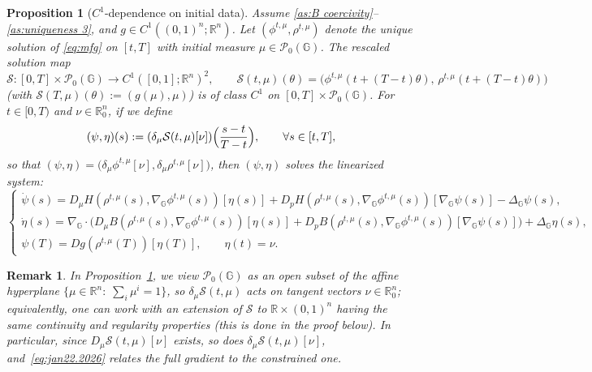 \documentclass[10pt]{article}
\newtheorem{proposition}[theorem]{Proposition}
\newtheorem{remark}[theorem]{Remark}
\numberwithin{equation}{section}
\newcommand{\cP}{ \mathcal{P}}
\newcommand{\cS}{ \mathcal{S}}
\newcommand{\bR}{\mathbb R}
\newcommand{\R}{\mathbb R}
\def\R{{\mathbb{R}}}
\def\G{\mathbb{G}}
\begin{document}
\begin{proposition}[$C^1$-dependence on initial data]\label{prop:C1-dependence}
Assume \eqref{as:B coercivity}--\eqref{as:uniqueness 3}, and $g \in C^1((0,1)^n;\R^n)$. Let $(\phi^{t,\mu}, \rho^{t,\mu})$ denote the unique solution of \eqref{eq:mfg} on $[t,T]$ with initial measure $\mu \in \cP_0(\G)$. The rescaled solution map
\[
\cS : [0,T] \times \cP_0(\G) \to C^1([0,1]; \R^n)^2, \qquad \cS(t,\mu)(\theta) = \big(\phi^{t,\mu}(t + (T-t)\theta), \, \rho^{t,\mu}(t + (T-t)\theta)\big)
\]
(with $\cS(T,\mu)(\theta) := (g(\mu), \mu)$) is of class $C^1$ on $[0,T] \times \cP_0(\G)$.
For $t \in [0,T)$ and $\nu \in \R^n_0$, if we define
 \[
 (\psi, \eta)(s) := (\delta_\mu \cS(t,\mu)[\nu])\Big({s-t \over T-t}\Big), \qquad \forall s \in [t,T],
 \]
so that $(\psi, \eta) = \big(\delta_\mu\phi^{t,\mu}[\nu], \delta_\mu \rho^{t,\mu}[\nu] \big)$, then $(\psi, \eta)$ solves the linearized system:
\begin{equation} \label{eq:lin-mfg}
\begin{cases}
\dot \psi(s) = D_\mu H(\rho^{t,\mu}(s), \nabla_\G \phi^{t,\mu}(s))[\eta(s)] + D_p H(\rho^{t,\mu}(s), \nabla_\G \phi^{t,\mu}(s))[\nabla_\G \psi(s)] - \Delta_\G \psi(s), \\[1mm]
\dot \eta(s) = \nabla_\G \cdot \big( D_\mu B(\rho^{t,\mu}(s), \nabla_\G \phi^{t,\mu}(s))[\eta(s)] + D_p B(\rho^{t,\mu}(s), \nabla_\G \phi^{t,\mu}(s))[\nabla_\G \psi(s)] \big) + \Delta_\G \eta(s), \\[1mm]
\psi(T) = Dg(\rho^{t,\mu}(T))[\eta(T)], \qquad \eta(t) = \nu.
\end{cases}
\end{equation}
\end{proposition}

\begin{remark}
In Proposition~\ref{prop:C1-dependence}, we view $\cP_0(\G)$ as an open subset of the affine hyperplane $\big\{\mu \in \bR^n:\; \sum_i \mu^i = 1\big\}$, so $\delta_\mu \cS(t,\mu)$ acts on tangent vectors $\nu \in \R^n_0$; equivalently, one can work with an extension of $\cS$ to $\R \times (0,1)^n$ having the same continuity and regularity properties (this is done in the proof below). In particular, since $D_\mu \cS(t,\mu)[\nu]$ exists, so does $\delta_\mu \cS(t,\mu)[\nu]$, and~\eqref{eq:jan22.2026} relates the full gradient to the constrained one.
\end{remark}
\end{document}
